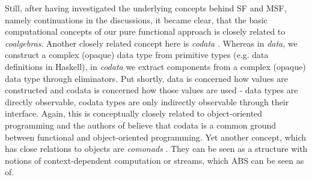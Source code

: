 Still, after having investigated the underlying concepts behind SF and MSF, namely continuations in the discussions, it became clear, that the basic computational concepts of our pure functional approach is closely related to \textit{coalgebras}. %
Another closely related concept here is \textit{codata} \cite{downen_codata_2019}. Whereas in \textit{data}, we construct a complex (opaque) data type from primitive types (e.g. data definitions in Haskell), in \textit{codata} we extract components from a complex (opaque) data type through eliminators. Put shortly, data is concerned how values are constructed and codata is concerned how those values are used \cite{downen_codata_2019} - data types are directly observable, codata types are only indirectly observable through their interface. Again, this is conceptually closely related to object-oriented programming and the authors of \cite{downen_codata_2019} believe that codata is a common ground between functional and object-oriented programming. Yet another concept, which has close relations to objects are \textit{comonads} \cite{uustalu_essence_2006}. They can be seen as a structure with notions of  context-dependent computation or streams, which ABS can be seen as of.

%
%

